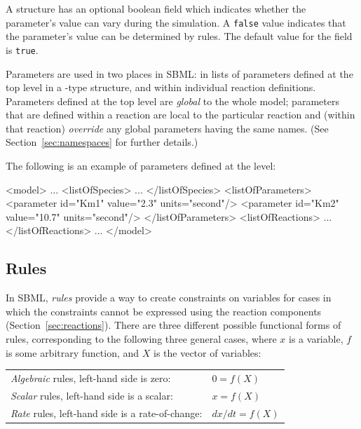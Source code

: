 \documentclass[10pt,twocolumntoc]{cekarticle}
\begin{document}
A  structure has an optional 
boolean field which indicates whether the parameter's value can
vary during the simulation.  A \texttt{false} value indicates that
the parameter's value can be determined by rules.  The
default value for the  field is \texttt{true}.

Parameters are used in two places in SBML: in lists of parameters defined
at the top level in a -type structure, and within individual
reaction definitions.  Parameters defined at the top level are
\emph{global} to the whole model; parameters that are defined within
a reaction are local to the particular reaction and (within that reaction)
\emph{override} any global parameters having the same names.  (See
Section~\ref{sec:namespaces} for further details.)

The following is an example of parameters defined at the  level:

\begin{example}
<model>
    ...
    <listOfSpecies>
        ...
    </listOfSpecies>
    <listOfParameters>
        <parameter id="Km1" value="2.3" units="second"/>
        <parameter id="Km2" value="10.7" units="second"/>
    </listOfParameters>
    <listOfReactions>
        ...
    </listOfReactions>
    ...
</model>
\end{example}

\subsection{Rules}
\label{sec:rules}

In SBML, \emph{rules} provide a way to create constraints on
variables for cases in which the constraints cannot be expressed
using the reaction components (Section~\ref{sec:reactions}). There
are three different possible functional forms of rules,
corresponding to the following three general cases, where $x$ is a
variable, $f$ is some arbitrary function, and $X$ is the vector of
variables:

\begin{center}
\begin{tabular}{ll}
  \emph{Algebraic} rules, left-hand side is zero:             & $0 = f(X)$\\
  \emph{Scalar} rules, left-hand side is a scalar:         & $x = f(X)$\\
  \emph{Rate} rules, left-hand side is a rate-of-change: & $dx/dt = f(X)$
\end{tabular}
\end{center}
\end{document}
